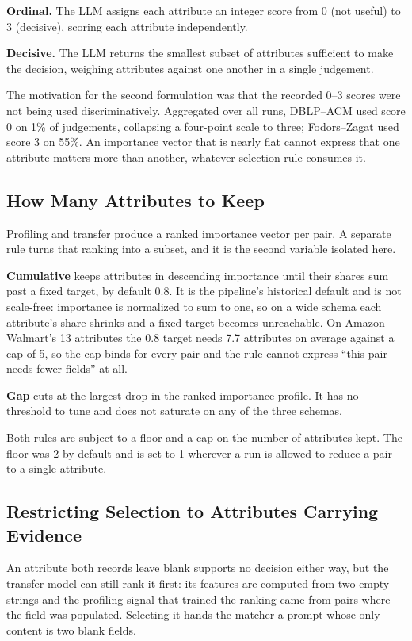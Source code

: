 \documentclass[11pt]{article}
\begin{document}
\textbf{Ordinal.} The LLM assigns each attribute an integer score from 0 (not useful) to 3
(decisive), scoring each attribute independently.

\textbf{Decisive.} The LLM returns the smallest subset of attributes sufficient to make the
decision, weighing attributes against one another in a single judgement.

The motivation for the second formulation was that the recorded 0--3 scores were not being
used discriminatively. Aggregated over all runs, DBLP--ACM used score 0 on 1\% of
judgements, collapsing a four-point scale to three; Fodors--Zagat used score 3 on 55\%. An
importance vector that is nearly flat cannot express that one attribute matters more than
another, whatever selection rule consumes it.

\subsection{How Many Attributes to Keep}
\label{sec:policy}

Profiling and transfer produce a ranked importance vector per pair. A separate rule turns
that ranking into a subset, and it is the second variable isolated here.

\textbf{Cumulative} keeps attributes in descending importance until their shares sum past a
fixed target, by default 0.8. It is the pipeline's historical default and is not scale-free:
importance is normalized to sum to one, so on a wide schema each attribute's share shrinks
and a fixed target becomes unreachable. On Amazon--Walmart's 13 attributes the 0.8 target
needs 7.7 attributes on average against a cap of 5, so the cap binds for every pair and the
rule cannot express ``this pair needs fewer fields'' at all.

\textbf{Gap} cuts at the largest drop in the ranked importance profile. It has no threshold
to tune and does not saturate on any of the three schemas.

Both rules are subject to a floor and a cap on the number of attributes kept. The floor was
2 by default and is set to 1 wherever a run is allowed to reduce a pair to a single
attribute.

\subsection{Restricting Selection to Attributes Carrying Evidence}
\label{sec:mask}

An attribute both records leave blank supports no decision either way, but the transfer
model can still rank it first: its features are computed from two empty strings and the
profiling signal that trained the ranking came from pairs where the field was populated.
Selecting it hands the matcher a prompt whose only content is two blank fields.
\end{document}
